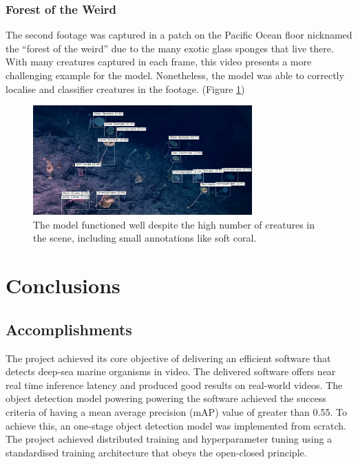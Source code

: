 \documentclass[12pt,a4paper,twoside,openany]{report}
\begin{document}
\subsection{Forest of the Weird}
The second footage was captured in a patch on the Pacific Ocean floor nicknamed the ``forest of the weird'' due to the many exotic glass sponges that live there. With many creatures captured in each frame, this video presents a more challenging example for the model. Nonetheless, the model was able to correctly localise and classifier creatures in the footage. (Figure \ref{fig:forest1})

\begin{figure}[H]
    \centering
    \includegraphics[width=0.75\textwidth]{figs/eval/video/forest/good.png}
    \caption{The model functioned well despite the high number of creatures in the scene, including small annotations like soft coral.}
    \label{fig:forest1}
\end{figure}


\chapter{Conclusions}

\section{Accomplishments}
The project achieved its core objective of delivering an efficient software that detects deep-sea marine organisms in video. The delivered software offers near real time inference latency and produced good results on real-world videos. The object detection model powering powering the software achieved the success criteria of having a mean average precision (mAP) value of greater than 0.55. To achieve this, an one-stage object detection model was implemented from scratch. The project achieved distributed training and hyperparameter tuning using a standardised training architecture that obeys the open-closed principle.
\end{document}
